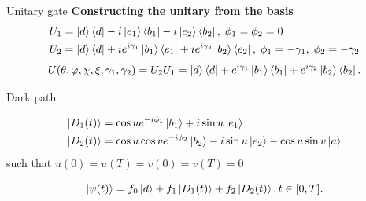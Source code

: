 \documentclass[t]{beamer}
\begin{document}
\begin{frame}{Unitary gate}
\textbf{Constructing the unitary from the basis}
\begin{equation}
\begin{aligned}&
U_1 = \ket{d}\bra{d} -i\ket{e_1}\bra{b_1} -i\ket{e_2}\bra{b_2},\; \phi_1 = \phi_2 = 0
\\&
U_2 = \ket{d}\bra{d} +ie^{i\gamma_1}\ket{b_1}\bra{e_1} +ie^{i\gamma_2}\ket{b_2}\bra{e_2},\; \phi_1 = -\gamma_1,\; \phi_2 = -\gamma_2
\end{aligned}
\end{equation}
\begin{equation}
U(\theta,\varphi,\chi,\xi,\gamma_1,\gamma_2) = U_2U_1 = \ket{d}\bra{d} + e^{i\gamma_1}\ket{b_1}\bra{b_1} + e^{i\gamma_2}\ket{b_2}\bra{b_2}.
\end{equation}
\end{frame}
\begin{frame}{Dark path}



\begin{equation}
\begin{aligned}
\ket{D_1(t)} &= \cos u e^{-i\phi_1}\ket{b_1} + i\sin u \ket{e_1}
\\
\ket{D_2(t)} &= \cos u\cos v e^{-i\phi_2}\ket{b_2} - i\sin u \ket{e_2} - \cos u\sin v \ket{a}
\end{aligned}
\end{equation}
such that $u(0) = u(T) = v(0) = v(T) = 0$

\begin{equation}
\ket{\psi(t)} = f_0\ket{d} + f_1\ket{D_1(t)} + f_2\ket{D_2(t)}, t \in [0,T].
\end{equation}
\end{frame}
\end{document}
